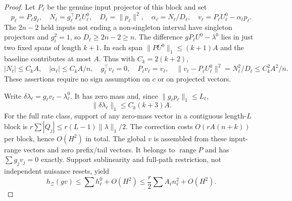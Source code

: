 \documentclass[11pt]{article}
\begin{document}
\begin{proof}
Let $P_\ell$ be the genuine input projector of this block and set
\[
p_\ell=P_\ell g_\ell,\quad N_\ell=g_\ell^\top P_\ell U_\ell^0,\quad
D_\ell=\|p_\ell\|^2,\quad
\alpha_\ell=N_\ell/D_\ell,\quad
v_\ell=P_\ell U_\ell^0-\alpha_\ell p_\ell.
\]
The $2n-2$ held inputs not ending a non-singleton interval have singleton
projectors and $g_i^2=1$, so $D_\ell\ge2n-2\ge n$.
The difference $gP_\ell U^0-\lambda^0$ lies in just two fixed spans of length
$k+1$. In each span $\|P U^0\|_1\le(k+1)A$ and the baseline contributes
at most $A$. Thus with $C_k=2(k+2)$,
\[
|N_\ell|\le C_kA,\quad
|\alpha_\ell|\le C_kA/n,\quad
g_\ell^\top v_\ell=0,\quad P_\ell v_\ell=v_\ell,\quad
\|v_\ell-P_\ell U_\ell^0\|^2=N_\ell^2/D_\ell\le C_k^2A^2/n.
\]
These assertions require no sign assumption on $c$ or on projected vectors.

Write $\delta\lambda_\ell=g_\ell v_\ell-\lambda_\ell^0$.
It has zero mass and, since $\|g_\ell p_\ell\|_1\le L_\ell$,
\[
\|\delta\lambda_\ell\|_1\le C_k(k+3)A.
\]
For the full rate class, support of any zero-mass vector in a contiguous
length-$L$ block is $r\sum|Q_j|\le r(L-1)\|\lambda\|_1/2$.
The correction costs $O(rA(n+k))$ per block, hence $O(H^2)$ in total.
The global $v$ is assembled from these input-range vectors and zero
prefix/tail vectors. It belongs to $\operatorname{range}P$ and has
$\sum g_jv_j=0$ exactly.
Support sublinearity and full-path restriction, not independent nuisance
resets, yield
\begin{equation}\label{eq:supportupper}
h_{\mathcal Z}(gv)\le\sum h_\ell^0+O(H^2)
\le\frac r2\sum A_\ell n_\ell^2+O(H^2).
\end{equation}


\end{proof}
\end{document}
